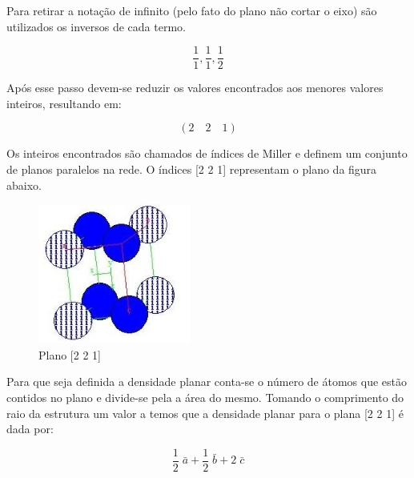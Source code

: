 \documentclass[10pt,twocolumn,letterpaper]{article}
\begin{document}
\hspace{1cm} Para retirar a notação de infinito (pelo fato do plano não cortar o eixo) são utilizados os inversos de cada termo.

\vspace{-0.15cm}

\begin{equation*}
    \frac{1}{1}, \frac{1}{1}, \frac{1}{2}
\end{equation*}

\hspace{1cm} Após esse passo devem-se reduzir os valores encontrados aos menores valores inteiros, resultando em:

\vspace{-0.25cm}

\begin{equation*}
    (2 \quad 2 \quad 1)
\end{equation*}

\hspace{1cm} Os inteiros encontrados são chamados de índices de Miller e definem um conjunto de planos paralelos na rede. O índices [2 2 1] representam o plano da figura abaixo. 

\begin{figure}[h]
    \centering
    \includegraphics[width=5cm]{fig3.jpg}
    \caption{Plano [2 2 1]}
    \label{fig:label}
\end{figure}

\hspace{1cm} Para que seja definida a densidade planar conta-se o número de átomos que estão contidos no plano e divide-se pela a área do mesmo. Tomando o comprimento do raio da estrutura um valor a temos que a densidade planar para o plana [2 2 1] é dada por:

\begin{equation*}
    \frac{1}{2}\;\bar{a} + \frac{1}{2}\;\bar{b} + 2\;\bar{c}
\end{equation*}

\end{document}
